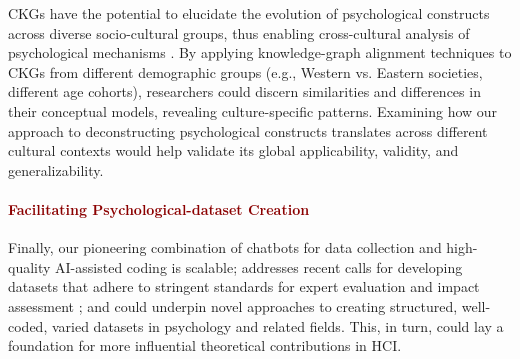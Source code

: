 CKGs have the potential to elucidate the evolution of psychological constructs across diverse socio-cultural groups, thus enabling cross-cultural analysis of psychological mechanisms \cite{crosscultural_obeid_2015}. 
By applying knowledge-graph alignment techniques \cite{kg_llm_pan_2024} to CKGs from different demographic groups (e.g., Western vs. Eastern societies, different age cohorts), researchers could discern similarities and differences in their conceptual models, revealing culture-specific patterns. 
Examining how our approach to deconstructing psychological constructs translates across different cultural contexts would help validate its global applicability, validity, and generalizability.






\paragraph{\textcolor{darkred}{\textbf{Facilitating Psychological-dataset Creation}}}

Finally, our pioneering combination of chatbots for data collection and high-quality AI-assisted coding is scalable; addresses recent calls for developing datasets that adhere to stringent standards for expert evaluation and impact assessment \cite{llm_psycho_demszky_2023}; and could underpin novel approaches to creating structured, well-coded, varied datasets in psychology and related fields. 
This, in turn, could lay a foundation for more influential theoretical contributions in HCI.



